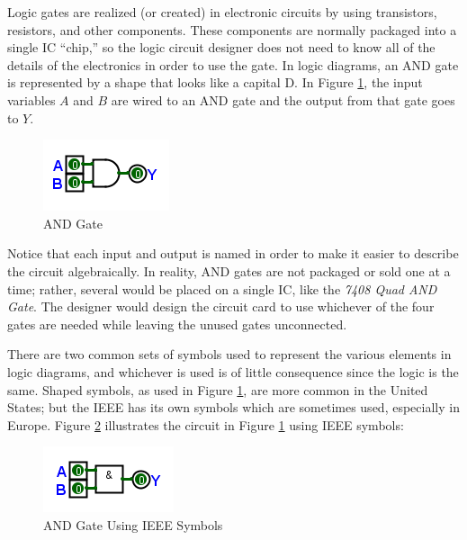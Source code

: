 Logic gates are realized (or created) in electronic circuits by using transistors, resistors, and other components. These components are normally packaged into a single \ac{IC} ``chip,'' so the logic circuit designer does not need to know all of the details of the electronics in order to use the gate. In logic diagrams, an \textsf{AND}  gate is represented by a shape that looks like a capital \textsf{D}. In Figure \ref{fig:04_01}, the input variables $ A $ and $ B $ are wired to an \textsf{AND}  gate and the output from that gate goes to $ Y $.

\begin{figure}[H]
	\centering
	\includegraphics[width=\maxwidth{.95\linewidth}]{gfx/04_01}
	\caption{AND Gate}
	\label{fig:04_01}
\end{figure}

Notice that each input and output is named in order to make it easier to describe the circuit algebraically. In reality, \textsf{AND}  gates are not packaged or sold one at a time; rather, several would be placed on a single \ac{IC}, like the \emph{7408 Quad AND Gate}. The designer would design the circuit card to use whichever of the four gates are needed while leaving the unused gates unconnected. 

There are two common sets of symbols used to represent the various elements in logic diagrams, and whichever is used is of little consequence since the logic is the same. Shaped symbols, as used in Figure \ref{fig:04_01}, are more common in the United States; but the \ac{IEEE} has its own symbols which are sometimes used, especially in Europe. Figure \ref{fig:04_02} illustrates the circuit in Figure \ref{fig:04_01} using \ac{IEEE} symbols:


\begin{figure}[H]
	\centering
	\includegraphics[width=\maxwidth{.95\linewidth}]{gfx/04_02}
	\caption{AND Gate Using IEEE Symbols}
	\label{fig:04_02}
\end{figure}

